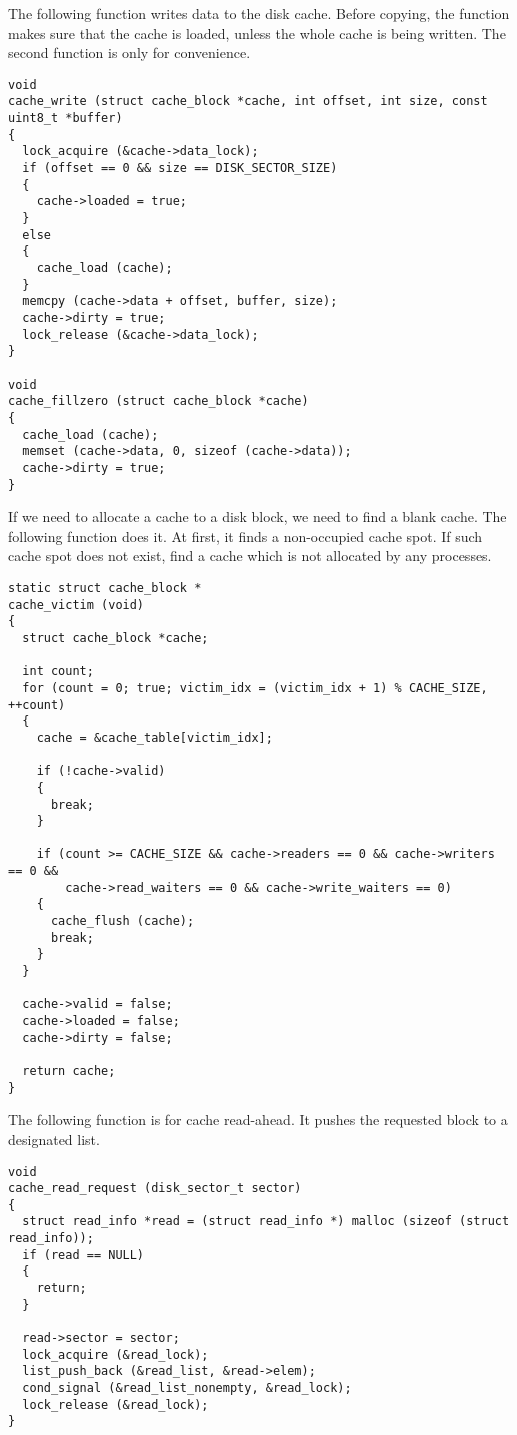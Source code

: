 \documentclass[a4paper,article,11pt,oneside]{article}
\begin{document}
The following function writes data to the disk cache. Before copying,
the function makes sure that the cache is loaded, unless the whole
cache is being written. The second function is only for convenience.
\begin{verbatim}
void
cache_write (struct cache_block *cache, int offset, int size, const uint8_t *buffer)
{
  lock_acquire (&cache->data_lock);
  if (offset == 0 && size == DISK_SECTOR_SIZE)
  {
    cache->loaded = true;
  }
  else
  {
    cache_load (cache);
  }
  memcpy (cache->data + offset, buffer, size);
  cache->dirty = true;
  lock_release (&cache->data_lock);
}

void
cache_fillzero (struct cache_block *cache)
{
  cache_load (cache);
  memset (cache->data, 0, sizeof (cache->data));
  cache->dirty = true;
}
\end{verbatim}

If we need to allocate a cache to a disk block, we need to find a
blank cache. The following function does it. At first, it finds a
non-occupied cache spot. If such cache spot does not exist, find a
cache which is not allocated by any processes.
\begin{verbatim}
static struct cache_block *
cache_victim (void)
{
  struct cache_block *cache;

  int count;
  for (count = 0; true; victim_idx = (victim_idx + 1) % CACHE_SIZE, ++count)
  {
    cache = &cache_table[victim_idx];

    if (!cache->valid)
    {
      break;
    }

    if (count >= CACHE_SIZE && cache->readers == 0 && cache->writers == 0 &&
        cache->read_waiters == 0 && cache->write_waiters == 0)
    {
      cache_flush (cache);
      break;
    }
  }

  cache->valid = false;
  cache->loaded = false;
  cache->dirty = false;

  return cache;
}
\end{verbatim}

The following function is for cache read-ahead. It pushes the
requested block to a designated list.
\begin{verbatim}
void
cache_read_request (disk_sector_t sector)
{
  struct read_info *read = (struct read_info *) malloc (sizeof (struct read_info));
  if (read == NULL)
  {
    return;
  }

  read->sector = sector;
  lock_acquire (&read_lock);
  list_push_back (&read_list, &read->elem);
  cond_signal (&read_list_nonempty, &read_lock);
  lock_release (&read_lock);
}
\end{verbatim}
\end{document}
